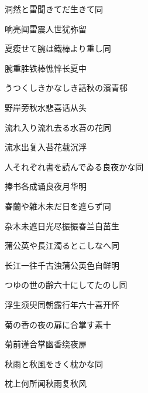 \begin{haiku}
    {\FH 洞然と雷聞きてだ生きて}\hfill{\FH 同}

    {\FK 响亮闻雷震人世犹弥留}
\end{haiku}

\begin{haiku}
    {\FH 夏瘦せて腕は鐵棒より重し}\hfill{\FH 同}

    {\FK 腕重胜铁棒憔悴长夏中}
\end{haiku}

\begin{haiku}
    {\FH うつくしきかなしき話秋の濱}\hfill{\FH 青邨}

    {\FK 野岸旁秋水悲喜话从头}
\end{haiku}

\begin{haiku}
    {\FH 流れ入り流れ去る水苔の花}\hfill{\FH 同}

    {\FK 流水出复入苔花载沉浮}
\end{haiku}

\begin{haiku}
    {\FH 人それぞれ書を読んでゐる良夜かな}\hfill{\FH 同}

    {\FK 捧书各成诵良夜月华明}
\end{haiku}

\begin{haiku}
    {\FH 春蘭や雑木未だ日を遮らず}\hfill{\FH 同}

    {\FK 杂木未遮日光尽振振春兰自茁生}
\end{haiku}

\begin{haiku}
    {\FH 蒲公英や長江濁るとこしなへ}\hfill{\FH 同}

    {\FK 长江一往千古浊蒲公英色自鲜明}
\end{haiku}

\begin{haiku}
    {\FH つゆの世の齢六十にしてたのし}\hfill{\FH 同}

    {\FK 浮生须臾同朝露行年六十喜开怀}
\end{haiku}

\begin{haiku}
    {\FH 菊の香の夜の扉に合掌す}\hfill{\FH 素十}

    {\FK 菊前谨合掌幽香绕夜扉}
\end{haiku}

\begin{haiku}
    {\FH 秋雨と秋風をきく枕かな}\hfill{\FH 同}

    {\FK 枕上何所闻秋雨复秋风}
\end{haiku}

